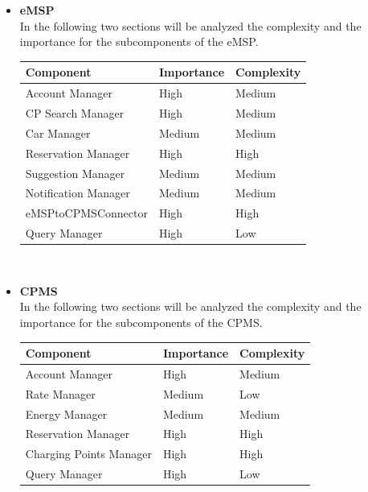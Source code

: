 \begin{itemize}
    \item \textbf{eMSP} \\ In the following two sections will be analyzed the complexity and the importance for the subcomponents of the eMSP.
    
    \begin{center}
        \begin{tabular}{|p{6cm}|l|l|}
            \hline
            \textbf{Component} & \textbf{Importance} & \textbf{Complexity}\\
            \hline
            Account Manager & High & Medium \\
            \hline
            CP Search Manager & High & Medium \\
            \hline
            Car Manager & Medium & Medium \\
            \hline
            Reservation Manager & High & High \\
            \hline
            Suggestion Manager & Medium & Medium \\
            \hline
            Notification Manager & Medium & Medium \\
            \hline
            eMSPtoCPMSConnector & High & High \\
            \hline
            Query Manager & High & Low \\
            \hline
         \end{tabular}
    \end{center}
    \noindent \\
    \item \textbf{CPMS} \\ In the following two sections will be analyzed the complexity and the importance for the subcomponents of the CPMS.
    
    \begin{center}
        \begin{tabular}{|p{6cm}|l|l|}
            \hline
            \textbf{Component} & \textbf{Importance} & \textbf{Complexity}\\
            \hline
            Account Manager & High & Medium \\
            \hline
            Rate Manager & Medium & Low \\
            \hline
            Energy Manager & Medium & Medium \\
            \hline
            Reservation Manager & High & High \\
            \hline
            Charging Points Manager & High & High \\
            \hline
            Query Manager & High & Low \\
            \hline
         \end{tabular}
    \end{center}
    \noindent \\
\end{itemize}

